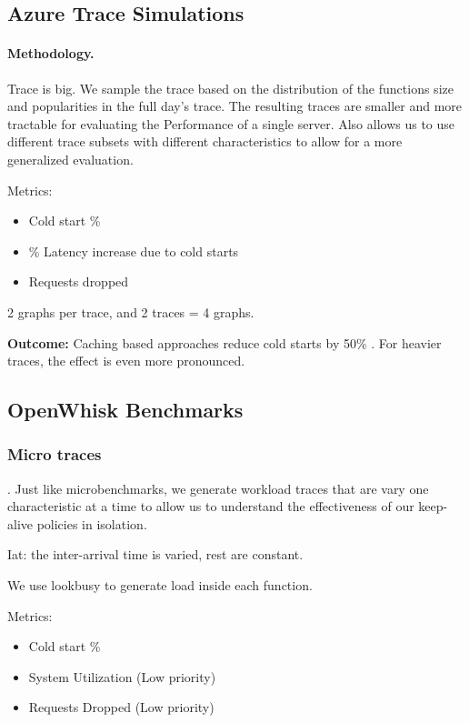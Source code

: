 
\subsection{Azure Trace Simulations}

\paragraph{Methodology.} Trace is big. We sample the trace based on the distribution of the functions size and popularities in the full day's trace. The resulting traces are smaller and more tractable for evaluating the Performance of a single server. Also allows us to use different trace subsets with different characteristics to allow for a more generalized evaluation. 

Metrics: 
\begin{itemize}
\item Cold start \% 
\item \% Latency increase due to cold starts
\item Requests dropped 
\end{itemize}

2 graphs per trace, and 2 traces = 4 graphs. 

\textbf{Outcome:} Caching based approaches reduce cold starts by 50\% . For heavier traces, the effect is even more pronounced. 


\subsection{OpenWhisk Benchmarks}

\subsubsection{Micro traces}. Just like microbenchmarks, we generate workload traces that are vary one characteristic at a time to allow us to understand the effectiveness of our keep-alive policies in isolation.

Iat: the inter-arrival time is varied, rest  are constant.

We use lookbusy to generate load inside each function.

Metrics:
\begin{itemize}
\item Cold start \%
\item System Utilization (Low priority) 
\item Requests Dropped (Low priority)
\end{itemize}

